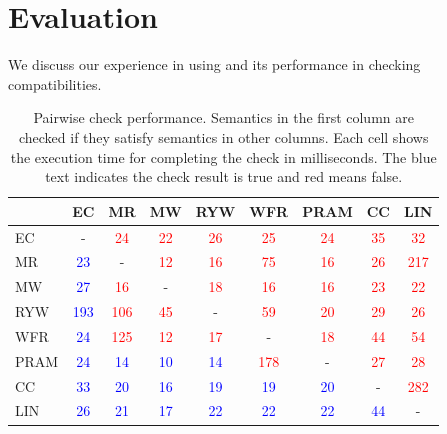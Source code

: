 \section{Evaluation} \label{sec:eval}

We discuss our experience in using \sysname{} and
its performance in checking compatibilities.

\newcommand{\tableT}{\textcolor{blue}{T}}
\newcommand{\tableF}{\textcolor{red}{F}}
\newcommand{\tableNA}{-}
\begin{table}
  \centering
  \small
  \caption{Pairwise check performance. Semantics in the first column
    are checked if they satisfy semantics in other columns. Each cell
    shows the execution time for completing the check in milliseconds. The
  blue text indicates the check result is true and red means false. }
  \label{tab:pairwise-time}
  \begin{tabular}{|l|c|c|c|c|c|c|c|c|}
    \hline
    {} &
    EC &
    MR &
    MW &
    RYW &
    WFR &
    PRAM &
    CC &
    LIN \\
    \hline
    EC   & \tableNA & \textcolor{red}{24} & \textcolor{red}{22} &
    \textcolor{red}{26} & \textcolor{red}{25} & \textcolor{red}{24} &
    \textcolor{red}{35} & \textcolor{red}{32} \\
    MR   & \textcolor{blue}{23} & \tableNA & \textcolor{red}{12} &
    \textcolor{red}{16} & \textcolor{red}{75} & \textcolor{red}{16} &
    \textcolor{red}{26} & \textcolor{red}{217} \\
    MW   & \textcolor{blue}{27} & \textcolor{red}{16} & \tableNA &
    \textcolor{red}{18} & \textcolor{red}{16} & \textcolor{red}{16} &
    \textcolor{red}{23} & \textcolor{red}{22} \\
    RYW  & \textcolor{blue}{193} & \textcolor{red}{106} &
    \textcolor{red}{45} & \tableNA & \textcolor{red}{59} &
    \textcolor{red}{20} & \textcolor{red}{29} & \textcolor{red}{26} \\
    WFR  & \textcolor{blue}{24} & \textcolor{red}{125} &
    \textcolor{red}{12} & \textcolor{red}{17} & \tableNA &
    \textcolor{red}{18} & \textcolor{red}{44} & \textcolor{red}{54} \\
    PRAM & \textcolor{blue}{24} & \textcolor{blue}{14} &
    \textcolor{blue}{10} & \textcolor{blue}{14} &
    \textcolor{red}{178} & \tableNA & \textcolor{red}{27} &
    \textcolor{red}{28} \\
    CC   & \textcolor{blue}{33} & \textcolor{blue}{20} &
    \textcolor{blue}{16} & \textcolor{blue}{19} &
    \textcolor{blue}{19} & \textcolor{blue}{20} & \tableNA &
    \textcolor{red}{282} \\
    LIN  & \textcolor{blue}{26} & \textcolor{blue}{21} &
    \textcolor{blue}{17} & \textcolor{blue}{22} &
    \textcolor{blue}{22} & \textcolor{blue}{22} &
    \textcolor{blue}{44} & \tableNA \\
    \hline
  \end{tabular}
\end{table}


